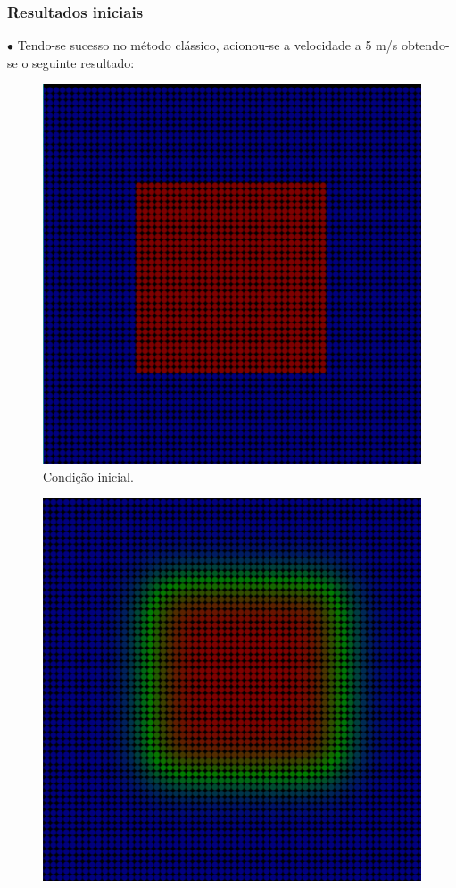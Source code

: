 \documentclass[xcolor=dvipsnames,10pt,aspectratio=169]{beamer}
\begin{document}
	\begin{frame}
		\frametitle{Resultados iniciais}
		$\bullet$ Tendo-se sucesso no método clássico, acionou-se a velocidade a 5 m/s obtendo-se o seguinte resultado:\\
		\begin{minipage}[h!]{0.30\textwidth}
			\begin{figure}[h!]
				\centering
				\includegraphics[trim = {1cm 1cm 1cm 1cm}, clip , angle=0, scale=0.3]{images/sucesso_!}
				\caption{Condição inicial.}
			\end{figure}
		\end{minipage}
		\begin{minipage}[h!]{0.30\textwidth}
			\begin{figure}[h!]
				\centering
				\includegraphics[trim = {1cm 1cm 1cm 1cm}, clip , angle=0, scale=0.3]{images/sucesso_velocidade_2}

\end{figure}
\end{minipage}
\end{frame}
\end{document}
